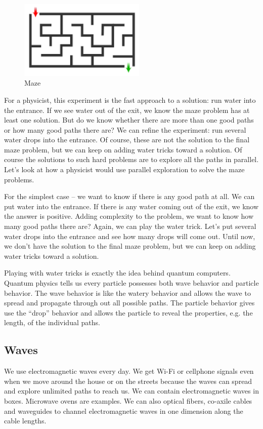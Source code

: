 \documentclass{book}
\begin{document}
\begin{figure}[ht]
\includegraphics[width=6cm]{maze.png}
\caption{Maze}
\label{Maze}
\end{figure}

For a physicist, this experiment is the fast approach to a solution: run water into the entrance. If we see water out of the exit, we know the maze problem has at least one solution. But do we know whether there are more than one good paths or how many good paths there are? We can refine the experiment: run several water drops into the entrance. Of course, these are not the solution to the final maze problem, but we can keep on adding water tricks toward a solution.
Of course the solutions to such hard problems are to explore all the paths in parallel. Let’s look at how a physicist would use parallel exploration to solve the maze problems.

For the simplest case – we want to know if there is any good path at all. We can put water into the entrance. If there is any water coming out of the exit, we know the answer is positive. Adding complexity to the problem, we want to know how many good paths there are? Again, we can play the water trick. Let’s put several water drops into the entrance and see how many drops will come out. Until now, we don't have the solution to the final maze problem, but we can keep on adding water tricks toward a solution.

Playing with water tricks is exactly the idea behind quantum computers. Quantum physics tells us every particle possesses both wave behavior and particle behavior. The wave behavior is like the watery behavior and allows the wave to spread and propagate through out all possible paths. The particle behavior gives use the “drop” behavior and allows the particle to reveal the properties, e.g. the length, of the individual paths.
\subsection{Waves}
We use electromagnetic waves every day. We get Wi-Fi or cellphone signals even when we move around the house or on the streets because the waves can spread and explore unlimited paths to reach us. We can contain electromagnetic waves in boxes. Microwave ovens are examples. We can also optical fibers, co-axile cables and waveguides to channel electromagnetic waves in one dimension along the cable lengths.
\end{document}
